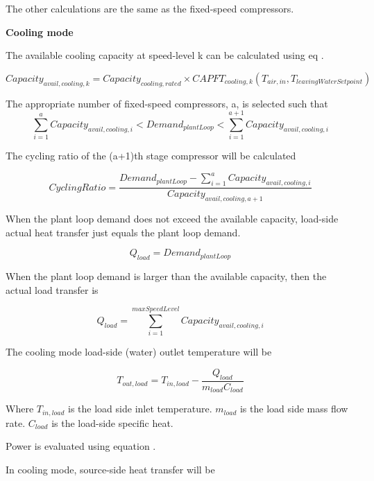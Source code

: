 The other calculations are the same as the fixed-speed compressors.

\noindent\textbf{Cooling mode}

The available cooling capacity at speed-level k can be calculated using eq .

\begin{equation}
Capacity_{avail,cooling,k} = Capacity_{cooling,rated} \times CAPFT_{cooling,k}(T_{air,in},T_{leavingWaterSetpoint}) 
\end{equation}

The appropriate number of fixed-speed compressors, a, is selected such that
\begin{equation}
\sum_{i=1}^{a} Capacity_{avail,cooling,i} < Demand_{plantLoop} < \sum_{i=1}^{a+1} Capacity_{avail,cooling,i} 
\end{equation}

The cycling ratio of the (a+1)th stage compressor will be calculated

\begin{equation}
CyclingRatio = \frac{Demand_{plantLoop} - \sum_{i=1}^{a} Capacity_{avail,cooling,i}}{Capacity_{avail,cooling,a+1}} 
\end{equation}

When the plant loop demand does not exceed the available capacity, load-side
actual heat transfer just equals the plant loop demand.

\begin{equation}
Q_{load} = Demand_{plantLoop} 
\end{equation}

When the plant loop demand is larger than the available capacity, then the actual load transfer is

\begin{equation}
Q_{load} = \sum_{i=1}^{maxSpeedLevel} Capacity_{avail,cooling,i} 
\end{equation}

The cooling mode load-side (water) outlet temperature will be 

\begin{equation}
T_{out,load} = T_{in,load} - \frac{Q_{load}}{m_{load}C_{load}} 
\end{equation}

Where $T_{in,load}$ is the load side inlet temperature. $m_{load}$ is the load side mass
flow rate. $C_{load}$ is the load-side specific heat.

Power is evaluated using equation . 

In cooling mode, source-side heat transfer will be

